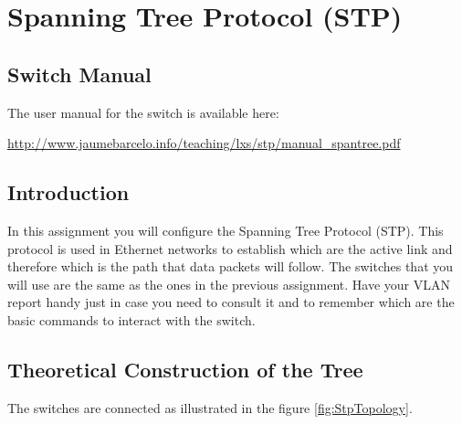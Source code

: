 \chapter{Spanning Tree Protocol (STP)}

\section{Switch Manual}
The user manual for the switch is available here:

\url{http://www.jaumebarcelo.info/teaching/lxs/stp/manual_spantree.pdf}

\section{Introduction}

In this assignment you will configure the Spanning Tree Protocol (STP). This protocol is used in Ethernet networks to establish which are the active link and therefore which is the path that data packets will follow. The switches that you will use are the same as the ones in the previous assignment. Have your VLAN report handy just in case you need to consult it and to remember which are the basic commands to interact with the switch.

\section{Theoretical Construction of the Tree}

The switches are connected as illustrated in the figure \ref{fig:StpTopology}.

